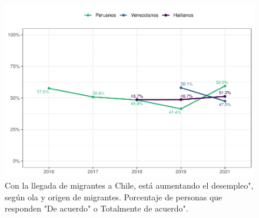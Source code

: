 \documentclass[
  12pt,
]{book}
\begin{document}
\begin{figure}

{\centering \includegraphics{reporte-elsoc_files/figure-latex/amen1-wave-1} 

}

\caption{Con la llegada de migrantes a Chile, está aumentando el desempleo", según ola y origen de migrantes. Porcentaje de personas que responden "De acuerdo" o Totalmente de acuerdo".}\label{fig:amen1-wave}
\end{figure}
\end{document}

